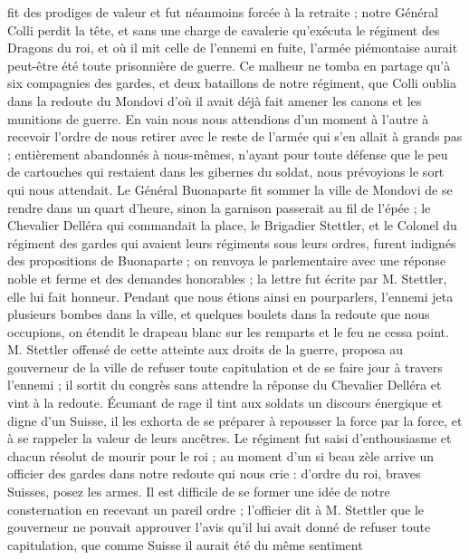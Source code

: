 \documentclass[12pt]{article}
\begin{document}
 fit des prodiges de valeur et fut néanmoins forcée à la
retraite ; notre Général Colli perdit la tête, et sans une charge de cavalerie qu’exécuta le
régiment des Dragons du roi, et où il mit celle de l’ennemi en fuite, l’armée piémontaise aurait
peut-être été toute prisonnière de guerre. Ce malheur ne tomba en partage qu’à six compagnies des
gardes, et deux bataillons de notre régiment, que Colli oublia dans la redoute du Mondovi d’où il
avait déjà fait amener les canons et les munitions de guerre. En vain nous nous attendions d’un
moment à l’autre à recevoir l’ordre de nous retirer avec le reste de l’armée qui s’en allait à
grands pas ; entièrement abandonnés à nous-mêmes, n’ayant pour toute défense que le peu de
cartouches qui restaient dans les gibernes du soldat, nous prévoyions le sort qui nous attendait. Le
Général Buonaparte fit sommer la ville de Mondovi de se rendre dans un quart d’heure, sinon la
garnison passerait au fil de l’épée ; le Chevalier Delléra qui commandait la place, le Brigadier
Stettler, et le Colonel du régiment des gardes qui avaient leurs régiments sous leurs ordres, furent
indignés des propositions de Buonaparte ; on renvoya le parlementaire avec une réponse noble et
ferme et des demandes honorables ; la lettre fut écrite par M. Stettler, elle lui fait honneur.
Pendant que nous étions ainsi en pourparlers, l’ennemi jeta plusieurs bombes dans la ville, et
quelques boulets dans la redoute que nous occupions, on étendit le drapeau blanc sur les remparts et
le feu ne cessa point. M. Stettler offensé de cette atteinte aux droits de la guerre, proposa au
gouverneur de la ville de refuser toute capitulation et de se faire jour à travers l’ennemi ; il
sortit du congrès sans attendre la réponse du Chevalier Delléra et vint à la redoute. Écumant de
rage il tint aux soldats un discours énergique et digne d’un Suisse, il les exhorta de se préparer à
repousser la force par la force, et à se rappeler la valeur de leurs ancêtres. Le régiment fut saisi
d’enthousiasme et chacun résolut de mourir pour le roi ; au moment d’un si beau zèle arrive un
officier des gardes dans notre redoute qui nous crie : d’ordre du roi, braves Suisses, posez les
armes. Il est difficile de se former une idée de notre consternation en recevant un pareil ordre ;
l’officier dit à M. Stettler que le gouverneur ne pouvait approuver l’avis qu’il lui avait donné de
refuser toute capitulation, que comme Suisse il aurait été du même sentiment
\end{document}
